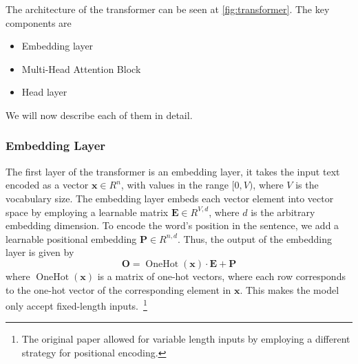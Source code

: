 The architecture of the transformer can be seen at \autoref{fig:transformer}.
The key components are
\begin{itemize}
    \item Embedding layer
    \item Multi-Head Attention Block
    \item Head layer
\end{itemize}
We will now describe each of them in detail.
\subsubsection{Embedding Layer}
The first layer of the transformer is an embedding layer, it takes the input text encoded as a vector $\mathbf{x} \in R^{n}$, with values in the range $[0, V)$, where $V$ is the vocabulary size.
The embedding layer embeds each vector element into vector space by employing a learnable matrix $\mathbf{E} \in R^{V, d}$, where $d$ is the arbitrary embedding dimension.
To encode the word's position in the sentence, we add a learnable positional embedding $\mathbf{P} \in R^{n, d}$.
Thus, the output of the embedding layer is given by
\begin{equation*}
    \mathbf{O} = \operatorname{OneHot}(\mathbf{x}) \cdot \mathbf{E} + \mathbf{P}
\end{equation*}
where $\operatorname{OneHot}(\mathbf{x})$ is a matrix of one-hot vectors, where each row corresponds to the one-hot vector of the corresponding element in $\mathbf{x}$.
This makes the model only accept fixed-length inputs.~\footnote{The original paper allowed for variable length inputs by employing a different strategy for positional encoding.}


